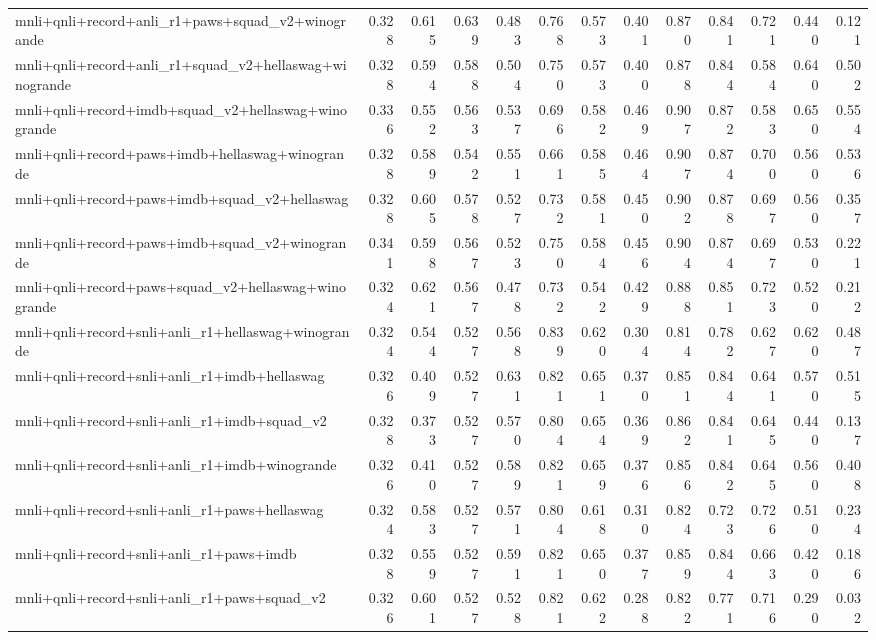 \begin{table}[t]
\begin{tabular}{lrrrrrrrrrrrr}
    mnli+qnli+record+anli\_r1+paws+squad\_v2+winogrande & 0.328 & 0.615 & 0.639 & 0.483 & 0.768 & 0.573 & 0.401 & 0.870 & 0.841 & 0.721 & 0.440 & 0.121 \\
    mnli+qnli+record+anli\_r1+squad\_v2+hellaswag+winogrande & 0.328 & 0.594 & 0.588 & 0.504 & 0.750 & 0.573 & 0.400 & 0.878 & 0.844 & 0.584 & 0.640 & 0.502 \\
    mnli+qnli+record+imdb+squad\_v2+hellaswag+winogrande & 0.336 & 0.552 & 0.563 & 0.537 & 0.696 & 0.582 & 0.469 & 0.907 & 0.872 & 0.583 & 0.650 & 0.554 \\
    mnli+qnli+record+paws+imdb+hellaswag+winogrande & 0.328 & 0.589 & 0.542 & 0.551 & 0.661 & 0.585 & 0.464 & 0.907 & 0.874 & 0.700 & 0.560 & 0.536 \\
    mnli+qnli+record+paws+imdb+squad\_v2+hellaswag & 0.328 & 0.605 & 0.578 & 0.527 & 0.732 & 0.581 & 0.450 & 0.902 & 0.878 & 0.697 & 0.560 & 0.357 \\
    mnli+qnli+record+paws+imdb+squad\_v2+winogrande & 0.341 & 0.598 & 0.567 & 0.523 & 0.750 & 0.584 & 0.456 & 0.904 & 0.874 & 0.697 & 0.530 & 0.221 \\
    mnli+qnli+record+paws+squad\_v2+hellaswag+winogrande & 0.324 & 0.621 & 0.567 & 0.478 & 0.732 & 0.542 & 0.429 & 0.888 & 0.851 & 0.723 & 0.520 & 0.212 \\
    mnli+qnli+record+snli+anli\_r1+hellaswag+winogrande & 0.324 & 0.544 & 0.527 & 0.568 & 0.839 & 0.620 & 0.304 & 0.814 & 0.782 & 0.627 & 0.620 & 0.487 \\
    mnli+qnli+record+snli+anli\_r1+imdb+hellaswag & 0.326 & 0.409 & 0.527 & 0.631 & 0.821 & 0.651 & 0.370 & 0.851 & 0.844 & 0.641 & 0.570 & 0.515 \\
    mnli+qnli+record+snli+anli\_r1+imdb+squad\_v2 & 0.328 & 0.373 & 0.527 & 0.570 & 0.804 & 0.654 & 0.369 & 0.862 & 0.841 & 0.645 & 0.440 & 0.137 \\
    mnli+qnli+record+snli+anli\_r1+imdb+winogrande & 0.326 & 0.410 & 0.527 & 0.589 & 0.821 & 0.659 & 0.376 & 0.856 & 0.842 & 0.645 & 0.560 & 0.408 \\
    mnli+qnli+record+snli+anli\_r1+paws+hellaswag & 0.324 & 0.583 & 0.527 & 0.571 & 0.804 & 0.618 & 0.310 & 0.824 & 0.723 & 0.726 & 0.510 & 0.234 \\
    mnli+qnli+record+snli+anli\_r1+paws+imdb & 0.328 & 0.559 & 0.527 & 0.591 & 0.821 & 0.650 & 0.377 & 0.859 & 0.844 & 0.663 & 0.420 & 0.186 \\
    mnli+qnli+record+snli+anli\_r1+paws+squad\_v2 & 0.326 & 0.601 & 0.527 & 0.528 & 0.821 & 0.622 & 0.288 & 0.822 & 0.771 & 0.716 & 0.290 & 0.032 \\

\end{tabular}
\end{table}
